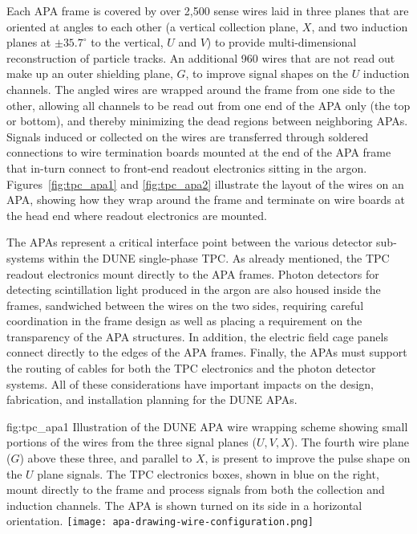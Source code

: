 Each APA frame is covered by over 2,500 sense wires laid in three planes that are oriented at angles to each other (a vertical collection plane, $X$, and two induction planes at $\pm35.7^\circ$ to the vertical, $U$ and $V$) to provide multi-dimensional reconstruction of particle tracks.  An additional 960 wires that are not read out make up an outer shielding plane, $G$, to improve signal shapes on the $U$ induction channels.  The angled wires are wrapped around the frame from one side to the other, allowing all channels to be read out from one end of the APA only (the top or bottom), and thereby minimizing the dead regions between neighboring APAs. Signals induced or collected on the wires are transferred through soldered connections to wire termination boards mounted at the end of the APA frame that in-turn connect to front-end readout electronics sitting in the argon.  Figures~\ref{fig:tpc_apa1} and \ref{fig:tpc_apa2} illustrate the layout of the wires on an APA, showing how they wrap around the frame and terminate on wire boards at the head end where readout electronics are mounted.

The APAs represent a critical interface point between the various detector sub-systems within the DUNE single-phase TPC.  As already mentioned, the TPC readout electronics mount directly to the APA frames.  Photon detectors for detecting scintillation light produced in the argon are also housed inside the frames, sandwiched between the wires on the two sides, requiring careful coordination in the frame design as well as placing a requirement on the transparency of the APA structures.  In addition, the electric field cage panels connect directly to the edges of the APA frames.  Finally, the APAs must support the routing of cables for both the TPC electronics and the photon detector systems. All of these considerations have important impacts on the design, fabrication, and installation planning for the DUNE APAs.   

\begin{dunefigure}{fig:tpc_apa1}
{Illustration of the DUNE APA wire wrapping scheme showing small portions of the wires from the three signal planes ($U,V,X$). The fourth wire plane ($G$) above these three, and parallel to $X$, is present to improve the pulse shape on the $U$ plane signals. The TPC electronics boxes, shown in blue on the right, mount directly to the frame and process signals from both the collection and induction channels. The APA is shown turned on its side in a horizontal orientation.} 
\texttt{[image: apa-drawing-wire-configuration.png]} 
\end{dunefigure} 

